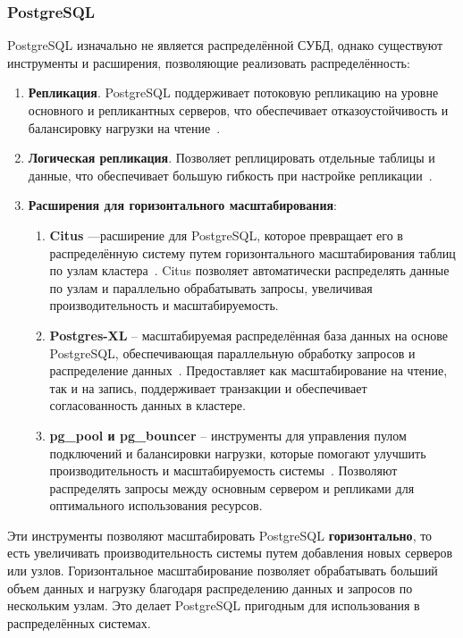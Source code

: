 \subsubsection{PostgreSQL}

PostgreSQL изначально не является распределённой СУБД, однако существуют инструменты и расширения, позволяющие реализовать распределённость:

\begin{enumerate}[leftmargin=1.6\parindent]
    \item \textbf{Репликация}. PostgreSQL поддерживает потоковую репликацию на уровне основного и репликантных серверов, что обеспечивает отказоустойчивость и балансировку нагрузки на чтение~\cite{postgres-rep}.
    \item \textbf{Логическая репликация}. Позволяет реплицировать отдельные таблицы и данные, что обеспечивает большую гибкость при настройке репликации~\cite{postgres-rep}.
    \item \textbf{Расширения для горизонтального масштабирования}:
    \begin{enumerate}
        \item \textbf{Citus} ---расширение для PostgreSQL, которое превращает его в распределённую систему путем горизонтального масштабирования таблиц по узлам кластера~\cite{citusdata}. Citus позволяет автоматически распределять данные по узлам и параллельно обрабатывать запросы, увеличивая производительность и масштабируемость.
        \item \textbf{Postgres-XL} -- масштабируемая распределённая база данных на основе PostgreSQL, обеспечивающая параллельную обработку запросов и распределение данных~\cite{postgres-xl}. Предоставляет как масштабирование на чтение, так и на запись, поддерживает транзакции и обеспечивает согласованность данных в кластере.
        \item \textbf{pg\_pool и pg\_bouncer} -- инструменты для управления пулом подключений и балансировки нагрузки, которые помогают улучшить производительность и масштабируемость системы~\cite{pgpool}\cite{pgbouncer}. Позволяют распределять запросы между основным сервером и репликами для оптимального использования ресурсов.
    \end{enumerate}
\end{enumerate}

Эти инструменты позволяют масштабировать PostgreSQL \textbf{горизонтально}, то есть увеличивать производительность системы путем добавления новых серверов или узлов. 
Горизонтальное масштабирование позволяет обрабатывать больший объем данных и нагрузку благодаря распределению данных и запросов по нескольким узлам. 
Это делает PostgreSQL пригодным для использования в распределённых системах.

